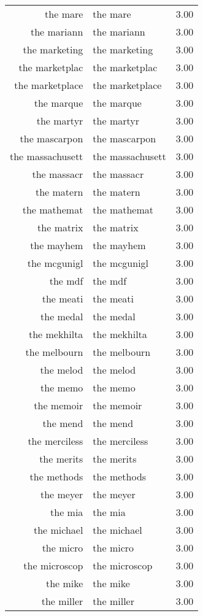\begin{table}[ht]
\begin{tabular}{rlr}
  the mare & the mare & 3.00 \\ 
  the mariann & the mariann & 3.00 \\ 
  the marketing & the marketing & 3.00 \\ 
  the marketplac & the marketplac & 3.00 \\ 
  the marketplace & the marketplace & 3.00 \\ 
  the marque & the marque & 3.00 \\ 
  the martyr & the martyr & 3.00 \\ 
  the mascarpon & the mascarpon & 3.00 \\ 
  the massachusett & the massachusett & 3.00 \\ 
  the massacr & the massacr & 3.00 \\ 
  the matern & the matern & 3.00 \\ 
  the mathemat & the mathemat & 3.00 \\ 
  the matrix & the matrix & 3.00 \\ 
  the mayhem & the mayhem & 3.00 \\ 
  the mcgunigl & the mcgunigl & 3.00 \\ 
  the mdf & the mdf & 3.00 \\ 
  the meati & the meati & 3.00 \\ 
  the medal & the medal & 3.00 \\ 
  the mekhilta & the mekhilta & 3.00 \\ 
  the melbourn & the melbourn & 3.00 \\ 
  the melod & the melod & 3.00 \\ 
  the memo & the memo & 3.00 \\ 
  the memoir & the memoir & 3.00 \\ 
  the mend & the mend & 3.00 \\ 
  the merciless & the merciless & 3.00 \\ 
  the merits & the merits & 3.00 \\ 
  the methods & the methods & 3.00 \\ 
  the meyer & the meyer & 3.00 \\ 
  the mia & the mia & 3.00 \\ 
  the michael & the michael & 3.00 \\ 
  the micro & the micro & 3.00 \\ 
  the microscop & the microscop & 3.00 \\ 
  the mike & the mike & 3.00 \\ 
  the miller & the miller & 3.00 \\ 

\end{tabular}
\end{table}
